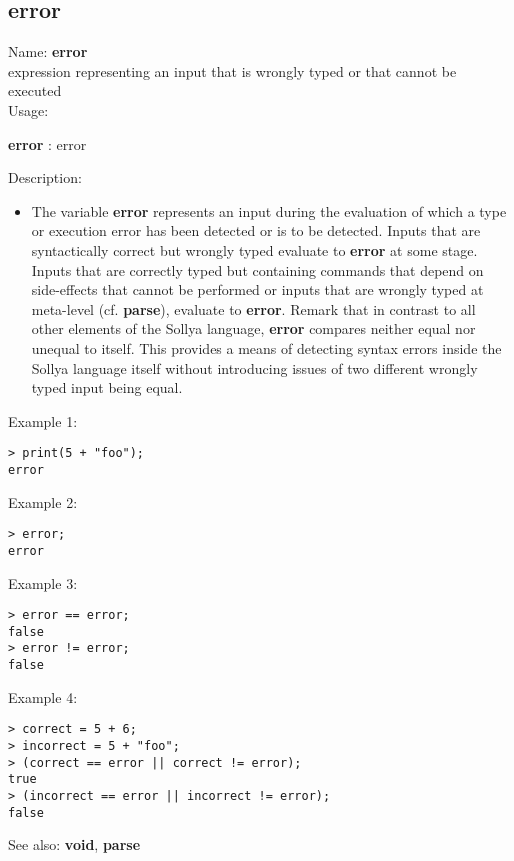 \subsection{ error }
\noindent Name: \textbf{error}\\
expression representing an input that is wrongly typed or that cannot be executed\\

\noindent Usage: 
\begin{center}
\textbf{error} : \textsf{error}\\
\end{center}
\noindent Description: \begin{itemize}

\item The variable \textbf{error} represents an input during the evaluation of
   which a type or execution error has been detected or is to be
   detected. Inputs that are syntactically correct but wrongly typed
   evaluate to \textbf{error} at some stage.  Inputs that are correctly typed
   but containing commands that depend on side-effects that cannot be
   performed or inputs that are wrongly typed at meta-level (cf. \textbf{parse}),
   evaluate to \textbf{error}.
   Remark that in contrast to all other elements of the Sollya language,
   \textbf{error} compares neither equal nor unequal to itself. This provides a
   means of detecting syntax errors inside the Sollya language itself
   without introducing issues of two different wrongly typed input being
   equal.
\end{itemize}
\noindent Example 1: 
\begin{center}\begin{minipage}{15cm}\begin{Verbatim}[frame=single]
> print(5 + "foo");
error
\end{Verbatim}
\end{minipage}\end{center}
\noindent Example 2: 
\begin{center}\begin{minipage}{15cm}\begin{Verbatim}[frame=single]
> error;
error
\end{Verbatim}
\end{minipage}\end{center}
\noindent Example 3: 
\begin{center}\begin{minipage}{15cm}\begin{Verbatim}[frame=single]
> error == error;
false
> error != error;
false
\end{Verbatim}
\end{minipage}\end{center}
\noindent Example 4: 
\begin{center}\begin{minipage}{15cm}\begin{Verbatim}[frame=single]
> correct = 5 + 6;
> incorrect = 5 + "foo";
> (correct == error || correct != error);
true
> (incorrect == error || incorrect != error);
false
\end{Verbatim}
\end{minipage}\end{center}
See also: \textbf{void}, \textbf{parse}

